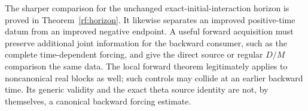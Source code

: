 The sharper comparison for the unchanged exact-initial-interaction
horizon is proved in Theorem~\ref{rf:horizon}. It likewise separates
an improved positive-time datum from an improved negative endpoint.
A useful forward acquisition must preserve additional joint information
for the backward consumer, such as the complete time-dependent forcing,
and give the direct source or regular $D/M$ comparison the same data.
The local forward theorem legitimately applies to noncanonical real
blocks as well; such controls may collide at an earlier backward time.
Its generic validity and the exact theta source identity are not, by
themselves, a canonical backward forcing estimate.
